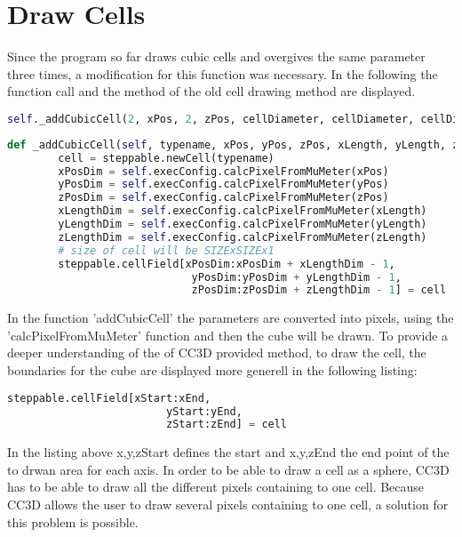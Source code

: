 \section{Draw Cells}
Since the program so far draws cubic cells and overgives the same parameter three times, a modification for this function was necessary. In the following the function call and the method of the old cell drawing method are displayed.
\begin{lstlisting}[language=Python, caption = function call of the cell drawing method addCubicCell for a 3D cell]
self._addCubicCell(2, xPos, 2, zPos, cellDiameter, cellDiameter, cellDiameter, steppable)
\end{lstlisting}
\begin{lstlisting}[language=Python, caption = method to draw cubic cells]
    def _addCubicCell(self, typename, xPos, yPos, zPos, xLength, yLength, zLength, steppable):
        cell = steppable.newCell(typename)
        xPosDim = self.execConfig.calcPixelFromMuMeter(xPos)
        yPosDim = self.execConfig.calcPixelFromMuMeter(yPos)
        zPosDim = self.execConfig.calcPixelFromMuMeter(zPos)
        xLengthDim = self.execConfig.calcPixelFromMuMeter(xLength)
        yLengthDim = self.execConfig.calcPixelFromMuMeter(yLength)
        zLengthDim = self.execConfig.calcPixelFromMuMeter(zLength)
        # size of cell will be SIZExSIZEx1
        steppable.cellField[xPosDim:xPosDim + xLengthDim - 1,
        					 yPosDim:yPosDim + yLengthDim - 1,
        					 zPosDim:zPosDim + zLengthDim - 1] = cell
\end{lstlisting}
In the function 'addCubicCell' the parameters are converted into pixels, using the 'calcPixelFromMuMeter' function and then the cube will be drawn. To provide a deeper understanding of the of \ac{CC3D} provided method, to draw the cell, the boundaries for the cube are displayed more generell in the following listing:
\begin{lstlisting}[language=Python, caption = boundaries of a drawn cuboid]
    steppable.cellField[xStart:xEnd,
    					 yStart:yEnd,
    					 zStart:zEnd] = cell
\end{lstlisting}        		
In the listing above x,y,zStart defines the start and x,y,zEnd the end point of the to drwan area for each axis.\newline
In order to be able to draw a cell as a sphere, \ac{CC3D} has to be able to draw all the different pixels containing to one cell. Because \ac{CC3D} allows the user to draw several pixels containing to one cell, a solution for this problem is possible.
